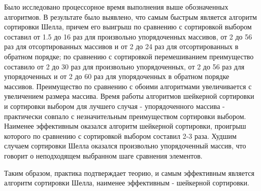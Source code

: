 \documentclass[a4paper,oneside,14pt]{extreport}
\begin{document}
Было исследовано процессорное время выполнения выше обозначенных алгоритмов. В результате было выявлено, что самым быстрым является алгоритм сортировки Шелла, причем его выигрыш по сравнению с сортировкой выбором составил от 1.5 до 16 раз для произвольно упорядоченных массивов, от 2 до 56 раз для отсортированных массивов и от 2 до 24 раз для отсортированных в обратном порядке; по сравнению с сортировкой перемешиванием преимущество составило от 2 до 30 раз для произвольно упорядоченных, от 2 до 56 раз для упорядоченных и от 2 до 60 раз для упорядоченных в обратном порядке массивов. Преимущество по сравнению с обоими алгоритмами увеличивается с увеличением размера массива. Время работы алгоритмов шейкерной сортировки и сортировки выбором для лучшего случая - упорядоченного массива - практически совпало с незначительным преимуществом сортировки выбором. Наименее эффективным оказался алгоритм шейкерной сортировки, проигрыш которого по сравнению с сортировкой выбором составил 2-3 раза. Худшим случаем сортировки Шелла оказался произвольно упорядоченный массив, что говорит о неподходящем выбранном шаге сравнения элементов.

Таким образом, практика подтверждает теорию, и самым эффективным является алгоритм сортировки Шелла, наименее эффективным - шейкерной сортировки.

\newpage
{}



\nocite{*}
\end{document}
